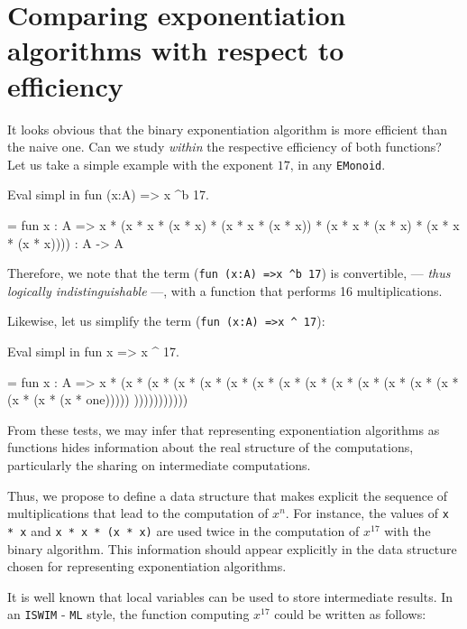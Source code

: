 \section{Comparing exponentiation algorithms with respect to efficiency}

It looks obvious that  the binary exponentiation algorithm is more efficient than the 
naive one. Can we study \emph{within \coq{}} the respective efficiency of both functions?
Let us take a simple example with the exponent $17$,  in any \texttt{EMonoid}.

\begin{Coqsrc}
Eval simpl in   fun (x:A) => x ^b 17.
\end{Coqsrc}

\begin{Coqanswer}
 = fun x : A =>
       x *
       (x * x * (x * x) * (x * x * (x * x)) *
        (x * x * (x * x) * (x * x * (x * x))))
     : A -> A  
\end{Coqanswer}

Therefore, we note that the term (\Verb|fun (x:A) =>x ^b 17|)  is
convertible, --- \emph{thus logically indistinguishable} ---, with a function that performs 16 multiplications.

Likewise, let us simplify the term (\Verb|fun (x:A) =>x ^ 17|):

\begin{Coqsrc}
Eval simpl in   fun x =>  x ^ 17.  
\end{Coqsrc}

\begin{Coqanswer}
= fun x : A =>
   x * (x *  (x *  (x *  (x *   (x *  (x *  (x *
    (x * (x * (x * (x * (x * (x * (x * (x * (x * one)))))
  )))))))))))  
\end{Coqanswer}


From these tests, we may infer that  representing exponentiation algorithms as \coq{}  functions hides
information about the real structure of the computations, particularly the sharing on intermediate computations.

Thus, we propose to define a data structure that makes explicit the sequence of multiplications that lead to the computation of $x^n$. For instance, the values of  
\texttt{x * x} and
\texttt{x * x * (x * x)}  are used
twice in the  computation of $x^{17}$ with the binary algorithm. This information should 
appear explicitly in the data structure chosen for representing exponentiation 
algorithms.

It is well known that local variables can be used to store intermediate results.
In an \texttt{ISWIM} - \texttt{ML} style, the function computing $x^{17}$ could be written as follows:

